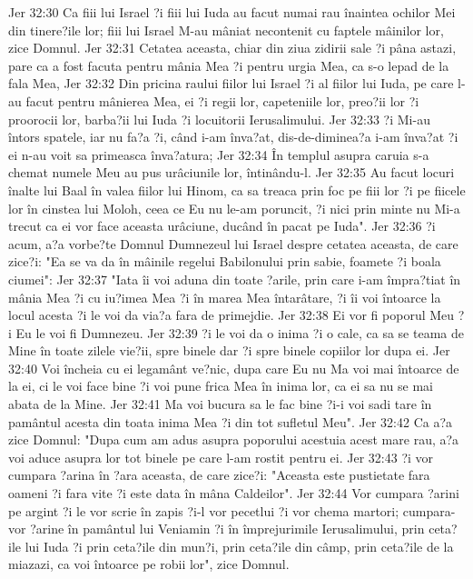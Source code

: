 Jer 32:30  Ca fiii lui Israel ?i fiii lui Iuda au facut numai rau înaintea ochilor Mei din tinere?ile lor; fiii lui Israel M-au mâniat necontenit cu faptele mâinilor lor, zice Domnul.
Jer 32:31  Cetatea aceasta, chiar din ziua zidirii sale ?i pâna astazi, pare ca a fost facuta pentru mânia Mea ?i pentru urgia Mea, ca s-o lepad de la fala Mea,
Jer 32:32  Din pricina raului fiilor lui Israel ?i al fiilor lui Iuda, pe care l-au facut pentru mânierea Mea, ei ?i regii lor, capeteniile lor, preo?ii lor ?i proorocii lor, barba?ii lui Iuda ?i locuitorii Ierusalimului.
Jer 32:33  ?i Mi-au întors spatele, iar nu fa?a ?i, când i-am înva?at, dis-de-diminea?a i-am înva?at ?i ei n-au voit sa primeasca înva?atura;
Jer 32:34  În templul asupra caruia s-a chemat numele Meu au pus urâciunile lor, întinându-l.
Jer 32:35  Au facut locuri înalte lui Baal în valea fiilor lui Hinom, ca sa treaca prin foc pe fiii lor ?i pe fiicele lor în cinstea lui Moloh, ceea ce Eu nu le-am poruncit, ?i nici prin minte nu Mi-a trecut ca ei vor face aceasta urâciune, ducând în pacat pe Iuda".
Jer 32:36  ?i acum, a?a vorbe?te Domnul Dumnezeul lui Israel despre cetatea aceasta, de care zice?i: "Ea se va da în mâinile regelui Babilonului prin sabie, foamete ?i boala ciumei":
Jer 32:37  "Iata îi voi aduna din toate ?arile, prin care i-am împra?tiat în mânia Mea ?i cu iu?imea Mea ?i în marea Mea întarâtare, ?i îi voi întoarce la locul acesta ?i le voi da via?a fara de primejdie.
Jer 32:38  Ei vor fi poporul Meu ?i Eu le voi fi Dumnezeu.
Jer 32:39  ?i le voi da o inima ?i o cale, ca sa se teama de Mine în toate zilele vie?ii, spre binele dar ?i spre binele copiilor lor dupa ei.
Jer 32:40  Voi încheia cu ei legamânt ve?nic, dupa care Eu nu Ma voi mai întoarce de la ei, ci le voi face bine ?i voi pune frica Mea în inima lor, ca ei sa nu se mai abata de la Mine.
Jer 32:41  Ma voi bucura sa le fac bine ?i-i voi sadi tare în pamântul acesta din toata inima Mea ?i din tot sufletul Meu".
Jer 32:42  Ca a?a zice Domnul: "Dupa cum am adus asupra poporului acestuia acest mare rau, a?a voi aduce asupra lor tot binele pe care l-am rostit pentru ei.
Jer 32:43  ?i vor cumpara ?arina în ?ara aceasta, de care zice?i: "Aceasta este pustietate fara oameni ?i fara vite ?i este data în mâna Caldeilor".
Jer 32:44  Vor cumpara ?arini pe argint ?i le vor scrie în zapis ?i-l vor pecetlui ?i vor chema martori; cumpara-vor ?arine în pamântul lui Veniamin ?i în împrejurimile Ierusalimului, prin ceta?ile lui Iuda ?i prin ceta?ile din mun?i, prin ceta?ile din câmp, prin ceta?ile de la miazazi, ca voi întoarce pe robii lor", zice Domnul.
